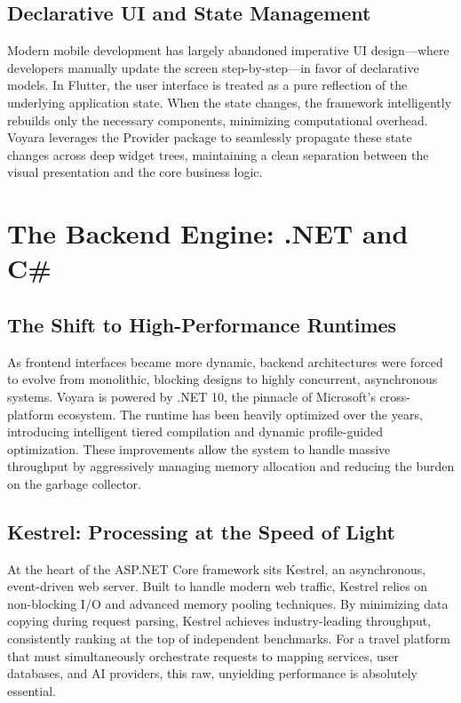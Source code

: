 \subsection{Declarative UI and State Management}
Modern mobile development has largely abandoned imperative UI design—where developers manually update the screen step-by-step—in favor of declarative models. In Flutter, the user interface is treated as a pure reflection of the underlying application state. When the state changes, the framework intelligently rebuilds only the necessary components, minimizing computational overhead. Voyara leverages the Provider package to seamlessly propagate these state changes across deep widget trees, maintaining a clean separation between the visual presentation and the core business logic.

\section{The Backend Engine: .NET and C\#}
\subsection{The Shift to High-Performance Runtimes}
As frontend interfaces became more dynamic, backend architectures were forced to evolve from monolithic, blocking designs to highly concurrent, asynchronous systems. Voyara is powered by .NET 10, the pinnacle of Microsoft's cross-platform ecosystem. The runtime has been heavily optimized over the years, introducing intelligent tiered compilation and dynamic profile-guided optimization. These improvements allow the system to handle massive throughput by aggressively managing memory allocation and reducing the burden on the garbage collector.

\subsection{Kestrel: Processing at the Speed of Light}
At the heart of the ASP.NET Core framework sits Kestrel, an asynchronous, event-driven web server. Built to handle modern web traffic, Kestrel relies on non-blocking I/O and advanced memory pooling techniques. By minimizing data copying during request parsing, Kestrel achieves industry-leading throughput, consistently ranking at the top of independent benchmarks. For a travel platform that must simultaneously orchestrate requests to mapping services, user databases, and AI providers, this raw, unyielding performance is absolutely essential.

